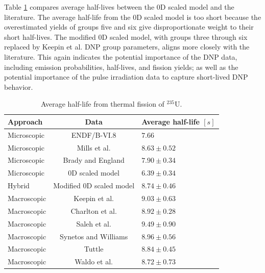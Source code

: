 Table \ref{tab:avg-halflife-net} compares average half-lives between the 0D scaled model and the literature.
The average half-life from the 0D scaled model is too short because the overestimated yields of groups five and six give disproportionate weight to their short half-lives.
The modified 0D scaled model, with groups three through six replaced by Keepin et al. \gls{DNP} group parameters, aligns more closely with the literature.
This again indicates the potential importance of the \gls{DNP} data, including emission probabilities, half-lives, and fission yields; as well as the potential importance of the pulse irradiation data to capture short-lived \gls{DNP} behavior.

\begin{table}[!h]
    \centering
    \caption{Average half-life from thermal fission of $^{235}$U.}
    \begin{tabular}{lcl}
        \hline
       Approach & Data & Average half-life $[s]$ \\
       \hline
        Microscopic & ENDF/B-VI.8 \cite{endf6}   & $7.66$ \\
        Microscopic & Mills et al. \cite{mills1991study}    & $8.63 \pm 0.52$ \\
        Microscopic & Brady and England \cite{brady1989delayed} & $7.90 \pm 0.34$\\
        Microscopic & 0D scaled model & $6.39 \pm 0.34$ \\
        Hybrid & Modified 0D scaled model & $8.74 \pm 0.46$\\
        Macroscopic & Keepin et al. \cite{keepin1957delayed} & $9.03 \pm 0.63$ \\
        Macroscopic & Charlton et al. \cite{charlton1996delayed}\tnote{*} & $8.92 \pm 0.28$\\
        Macroscopic & Saleh et al. \cite{saleh1997measurements} & $9.49 \pm 0.90$ \\
        Macroscopic & Synetos and Williams \cite{synetos1983delayed}\tnote{*} & $8.96 \pm 0.56$ \\
        Macroscopic & Tuttle \cite{tuttle1975delayed}    & $8.84 \pm 0.45$\\
        Macroscopic & Waldo et al.\cite{waldo1981delayed}    & $8.72 \pm 0.73$ \\
        \hline
    \end{tabular}
    \label{tab:avg-halflife-net}
\end{table}

\FloatBarrier